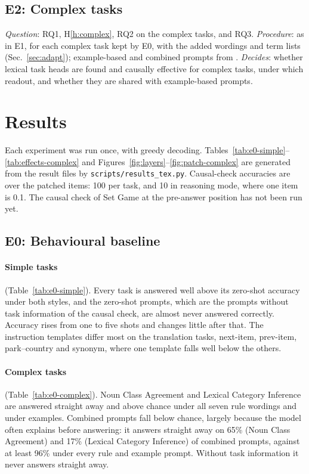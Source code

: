 \documentclass[11pt,a4paper]{article}
\begin{document}
\subsection{E2: Complex tasks}\label{sec:e2}
\emph{Question}: RQ1, H\ref{h:complex}, RQ2 on the complex tasks, and RQ3. \emph{Procedure}: as in E1, for each complex task kept by E0, with the added wordings and term lists (Sec.~\ref{sec:adapt}); example-based and combined prompts from \citet{fu2026rules}. \emph{Decides}: whether lexical task heads are found and causally effective for complex tasks, under which readout, and whether they are shared with example-based prompts.

\section{Results}\label{sec:results}
Each experiment was run once, with greedy decoding. Tables~\ref{tab:e0-simple}--\ref{tab:effects-complex} and Figures~\ref{fig:layers}--\ref{fig:patch-complex} are generated from the result files by \texttt{scripts/results\_tex.py}. Causal-check accuracies are over the patched items: 100 per task, and 10 in reasoning mode, where one item is 0.1. The causal check of Set Game at the pre-answer position has not been run yet.

\subsection{E0: Behavioural baseline}\label{sec:res-e0}
\paragraph{Simple tasks} (Table~\ref{tab:e0-simple}). Every task is answered well above its zero-shot accuracy under both styles, and the zero-shot prompts, which are the prompts without task information of the causal check, are almost never answered correctly. Accuracy rises from one to five shots and changes little after that. The instruction templates differ most on the translation tasks, next-item, prev-item, park--country and synonym, where one template falls well below the others.

\paragraph{Complex tasks} (Table~\ref{tab:e0-complex}). Noun Class Agreement and Lexical Category Inference are answered straight away and above chance under all seven rule wordings and under examples. Combined prompts fall below chance, largely because the model often explains before answering: it answers straight away on 65\% (Noun Class Agreement) and 17\% (Lexical Category Inference) of combined prompts, against at least 96\% under every rule and example prompt. Without task information it never answers straight away.
\end{document}
